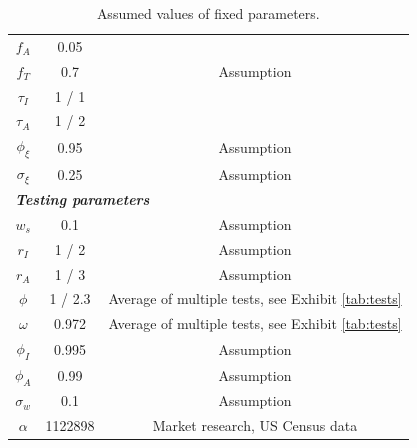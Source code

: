 \documentclass{article}
\begin{document}
\begin{table}
\begin{center}
\begin{tabular}{|c|cccc|c|}
$f_A$ & \multicolumn{4}{|c|}{0.05} & \citet{moghadasCOVID} \\
$f_T$ & \multicolumn{4}{|c|}{0.7} & Assumption \\
$\tau_I$ & \multicolumn{4}{|c|}{1 / 1} & \citet{moghadasCOVID} \\
$\tau_A$ & \multicolumn{4}{|c|}{1 / 2} & \citet{moghadasCOVID} \\
$\phi_\xi$ & \multicolumn{4}{|c|}{0.95} & Assumption \\
$\sigma_\xi$ & \multicolumn{4}{|c|}{0.25} & Assumption \\
\hline
\multicolumn{6}{|l|}{\textbf{\emph{Testing parameters}}} \\
\hline
$w_s$ & \multicolumn{4}{|c|}{0.1} & Assumption  \\
$r_I$ & \multicolumn{4}{|c|}{1 / 2} & Assumption \\
$r_A$ & \multicolumn{4}{|c|}{1 / 3} & Assumption \\
$\phi$ & \multicolumn{4}{|c|}{1 / 2.3} & Average of multiple tests, see Exhibit \ref{tab:tests} \\
$\omega$ & \multicolumn{4}{|c|}{0.972} & Average of multiple tests, see Exhibit \ref{tab:tests} \\
$\phi_I$ & \multicolumn{4}{|c|}{0.995} & Assumption \\
$\phi_A$ & \multicolumn{4}{|c|}{0.99} & Assumption \\
$\sigma_w$ & \multicolumn{4}{|c|}{0.1} & Assumption \\
$\alpha$ & \multicolumn{4}{|c|}{1122898} & Market research, US Census data \\
\hline
\end{tabular}
\caption{Assumed values of fixed parameters.}
\label{tab:fixed}
\end{center}
\end{table}
\end{document}
